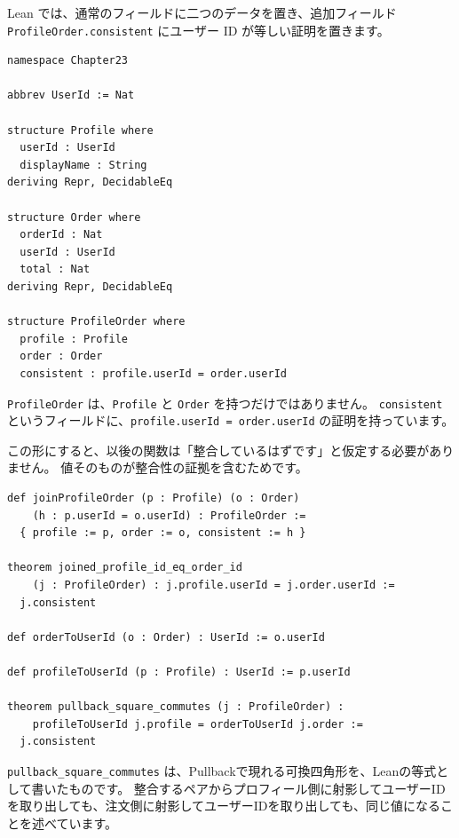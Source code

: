Lean では、通常のフィールドに二つのデータを置き、追加フィールド
\texttt{ProfileOrder.consistent} にユーザー ID が等しい証明を置きます。

\begin{listing}[htbp]
\begin{verbatim}
namespace Chapter23

abbrev UserId := Nat

structure Profile where
  userId : UserId
  displayName : String
deriving Repr, DecidableEq

structure Order where
  orderId : Nat
  userId : UserId
  total : Nat
deriving Repr, DecidableEq

structure ProfileOrder where
  profile : Profile
  order : Order
  consistent : profile.userId = order.userId
\end{verbatim}
\caption{\texttt{ProfileOrder}}
\label{lst:ch23-profile-order}
\end{listing}

\texttt{ProfileOrder} は、\texttt{Profile} と \texttt{Order} を持つだけではありません。
\texttt{consistent} というフィールドに、\texttt{profile.userId = order.userId} の証明を持っています。

この形にすると、以後の関数は「整合しているはずです」と仮定する必要がありません。
値そのものが整合性の証拠を含むためです。

\begin{listing}[htbp]
\begin{verbatim}
def joinProfileOrder (p : Profile) (o : Order)
    (h : p.userId = o.userId) : ProfileOrder :=
  { profile := p, order := o, consistent := h }

theorem joined_profile_id_eq_order_id
    (j : ProfileOrder) : j.profile.userId = j.order.userId :=
  j.consistent

def orderToUserId (o : Order) : UserId := o.userId

def profileToUserId (p : Profile) : UserId := p.userId

theorem pullback_square_commutes (j : ProfileOrder) :
    profileToUserId j.profile = orderToUserId j.order :=
  j.consistent
\end{verbatim}
\caption{\texttt{pullback\_square\_commutes}}
\label{lst:ch23-pullback-square}
\end{listing}

\texttt{pullback\_square\_commutes} は、Pullbackで現れる可換四角形を、Leanの等式として書いたものです。
整合するペアからプロフィール側に射影してユーザーIDを取り出しても、注文側に射影してユーザーIDを取り出しても、同じ値になることを述べています。

